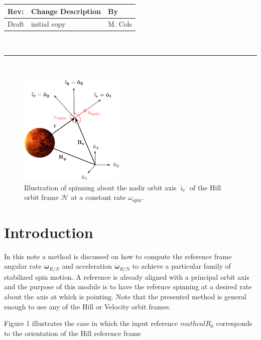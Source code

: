 \documentclass[]{AVSSimReportMemo}
\begin{document}
\makeCover


%
%
\pagestyle{empty}
{\renewcommand{\arraystretch}{2}
\noindent
\begin{longtable}{|p{0.5in}|p{4.5in}|p{1.14in}|}
\hline
{\bfseries Rev}: & {\bfseries Change Description} & {\bfseries By} \\
\hline
Draft & initial copy & M. Cols \\
\hline

\end{longtable}
}

\newpage
\setcounter{page}{1}
\pagestyle{fancy}

\tableofcontents
~\\ \hrule ~\\

\begin{figure}[htb]
	\centerline{
	\includegraphics[width=5cm]{Figures/Fig1}
	}
	\caption{Illustration of spinning about the nadir orbit axis $\bm\hat{\imath}_{r}$ of the Hill orbit frame $\mathcal{H}$  at a constant rate $\omega_{\textrm{spin}}$.}
	\label{fig:Fig1}
\end{figure}

\section{Introduction}
In this note a method is discussed on how to compute the reference frame angular rate $\bm\omega_{R/N}$ and acceleration $\dot{\bm\omega}_{R/N}$ to achieve a particular family of stabilized spin motion. A reference is already aligned with a principal orbit axis and the purpose of this module is to have the refernce spinning at a desired rate about the axis at which is pointing. Note that the presented method is general enough to use any of the Hill or Velocity orbit frames.\par
Figure 1 illustrates the case in which the input reference $mathcal{R_{0}}$ corresponds to the orientation of the Hill reference frame 
\end{document}
